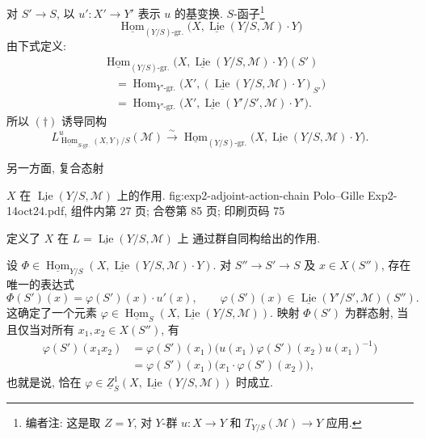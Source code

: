 对 \(S'\to S\), 以 \(u':X'\to Y'\) 表示 \(u\) 的基变换.
\(S\)-函子\footnote{编者注: 这是取 \(Z=Y\), 对 \(Y\)-群
\(u:X\to Y\) 和 \(T_{Y/S}(\mathcal M)\to Y\)
应用.}
\[
 \underline{\operatorname{Hom}}_{(Y/S)\text{-gr.}}
   \bigl(X,\underline{\operatorname{Lie}}(Y/S,\mathcal M)\cdot Y\bigr)
\]
由下式定义:
\[
\begin{aligned}
 &\underline{\operatorname{Hom}}_{(Y/S)\text{-gr.}}
 \bigl(X,\underline{\operatorname{Lie}}(Y/S,\mathcal M)\cdot Y\bigr)(S')\\
 &\quad=
 \operatorname{Hom}_{Y'\text{-gr.}}
 \bigl(X',(\underline{\operatorname{Lie}}(Y/S,\mathcal M)\cdot Y)_{S'}\bigr)\\
 &\quad=
 \operatorname{Hom}_{Y'\text{-gr.}}
 \bigl(X',\underline{\operatorname{Lie}}(Y'/S',\mathcal M)\cdot Y'\bigr).
\end{aligned}
\]
所以 \((\dagger)\) 诱导同构
\begin{equation}
 L^u_{\underline{\operatorname{Hom}}_{S\text{-gr.}}(X,Y)/S}
   (\mathcal M)
 \xrightarrow{\sim}
 \underline{\operatorname{Hom}}_{(Y/S)\text{-gr.}}
 \bigl(X,\underline{\operatorname{Lie}}(Y/S,\mathcal M)\cdot Y\bigr).
 \tag{\(\dagger'\)}\label{sga3:ii:subsection:4-2:equation:dagger-prime}
\end{equation}

另一方面, 复合态射

  {\(X\) 在 \(\underline{\operatorname{Lie}}(Y/S,\mathcal M)\) 上的作用.}
  {fig:exp2-adjoint-action-chain}
  {Polo--Gille Exp2-14oct24.pdf, 组件内第 27 页; 合卷第 85 页; 印刷页码 75}

定义了 \(X\) 在 \(L=\underline{\operatorname{Lie}}(Y/S,\mathcal M)\) 上
通过群自同构给出的作用.

设 \(\Phi\in\underline{\operatorname{Hom}}_{Y/S}
(X,\underline{\operatorname{Lie}}(Y/S,\mathcal M)\cdot Y)\).
对 \(S''\to S'\to S\) 及 \(x\in X(S'')\), 存在唯一的表达式
\[
 \Phi(S')(x)=\varphi(S')(x)\cdot u'(x),
 \qquad
 \varphi(S')(x)\in
 \underline{\operatorname{Lie}}(Y'/S',\mathcal M)(S'').
\]
这确定了一个元素 \(\varphi\in\underline{\operatorname{Hom}}_S
(X,\underline{\operatorname{Lie}}(Y/S,\mathcal M))\).
映射 \(\Phi(S')\) 为群态射, 当且仅当对所有 \(x_1,x_2\in X(S'')\), 有
\[
\begin{aligned}
 \varphi(S')(x_1x_2)
 &=\varphi(S')(x_1)
   \bigl(u(x_1)\varphi(S')(x_2)u(x_1)^{-1}\bigr)\\
 &=\varphi(S')(x_1)
   \bigl(x_1\cdot\varphi(S')(x_2)\bigr),
\end{aligned}
\]
也就是说, 恰在 \(\varphi\in\underline Z^1_S
(X,\underline{\operatorname{Lie}}(Y/S,\mathcal M))\) 时成立.

